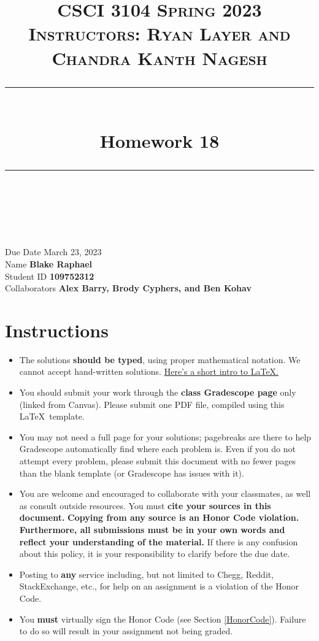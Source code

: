 \documentclass[11pt]{article}
\title{
\normalfont \normalsize 
\textsc{CSCI 3104 Spring 2023 \\ 
Instructors: Ryan Layer and Chandra Kanth Nagesh} \\
[10pt] 
\rule{\linewidth}{0.5pt} \\[6pt] 
\huge Homework 18 \\
\rule{\linewidth}{2pt}  \\[10pt]
}
\author{}
\date{}
\theoremstyle{definition}
\theoremstyle{definition}
\theoremstyle{definition}
\begin{document}

\maketitle


\noindent
Due Date \dotfill March 23, 2023 \\
Name \dotfill \textbf{Blake Raphael} \\
Student ID \dotfill \textbf{109752312} \\
Collaborators \dotfill \textbf{Alex Barry, Brody Cyphers, and Ben Kohav}

\tableofcontents

\section{Instructions}
 \begin{itemize}
	\item The solutions \textbf{should be typed}, using proper mathematical notation. We cannot accept hand-written solutions. \href{http://ece.uprm.edu/~caceros/latex/introduction.pdf}{Here's a short intro to \LaTeX.}
	\item You should submit your work through the \textbf{class Gradescope page} only (linked from Canvas). Please submit one PDF file, compiled using this \LaTeX \ template.
	\item You may not need a full page for your solutions; pagebreaks are there to help Gradescope automatically find where each problem is. Even if you do not attempt every problem, please submit this document with no fewer pages than the blank template (or Gradescope has issues with it).

	\item You are welcome and encouraged to collaborate with your classmates, as well as consult outside resources. You must \textbf{cite your sources in this document.} \textbf{Copying from any source is an Honor Code violation. Furthermore, all submissions must be in your own words and reflect your understanding of the material.} If there is any confusion about this policy, it is your responsibility to clarify before the due date. 

	\item Posting to \textbf{any} service including, but not limited to Chegg, Reddit, StackExchange, etc., for help on an assignment is a violation of the Honor Code.

	\item You \textbf{must} virtually sign the Honor Code (see Section \ref{HonorCode}). Failure to do so will result in your assignment not being graded.
\end{itemize}
\end{document}
